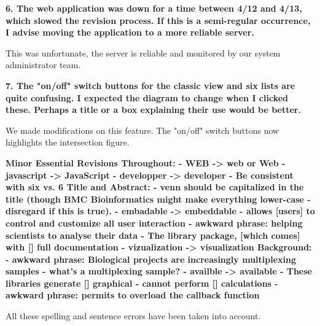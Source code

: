 \documentclass[10pt,stdletter,dateno,sigleft]{newlfm} %
\begin{document}
\begin{newlfm}
\textbf{6. The web application was down for a time between 4/12 and 4/13,
which slowed the revision process. If this is a semi-regular
occurrence, I advise moving the application to a more reliable server.}

This was unfortunate, the server is reliable and monitored by our system
administrator team.

\textbf{7. The "on/off" switch buttons for the classic view and six lists are
quite confusing. I expected the diagram to change when I clicked
these. Perhaps a title or a box explaining their use would be better.}

We made modifications on this feature. The "on/off" switch buttons now
highlights the intersection figure.


\textbf{Minor Essential Revisions
Throughout: \newline
- WEB -> web or Web \newline
- javascript -> JavaScript \newline
- developper -> developer \newline
- Be consistent with six vs. 6 \newline
Title and Abstract: \newline
- venn should be capitalized in the title (though BMC Bioinformatics
might make everything lower-case - disregard if this is true). \newline
- embadable -> embeddable \newline
- allows [users] to control and customize all user interaction \newline
- awkward phrase: helping scientists to analyse their data \newline 
- The library package, [which comes] with [] full documentation \newline
- vizualization -> visualization \newline
Background: \newline
- awkward phrase: Biological projects are increasingly multiplexing
samples - what's a multiplexing sample? \newline
- availble -> available \newline
- These libraries generate [] graphical \newline
- cannot perform [] calculations \newline
- awkward phrase: permits to overload the callback function \newline}

All these spelling and sentence errors have been taken into account.


\end{newlfm}
\end{document}

